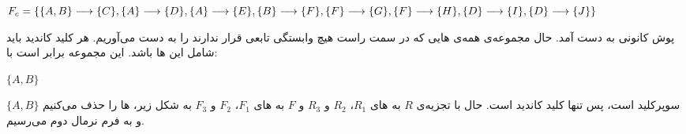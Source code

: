 \documentclass{article}
\begin{document}
\begin{itemize}
\begin{latin}
$
\\F_{c}=\\
\{\\
\{A, B\}\longrightarrow\{C\},\\
\{A\}\longrightarrow\{D\},\\
\{A\}\longrightarrow\{E\},\\
\{B\}\longrightarrow\{F\},\\
\{F\}\longrightarrow\{G\},\\
\{F\}\longrightarrow\{H\},\\
\{D\}\longrightarrow\{I\},\\
\{D\}\longrightarrow\{J\}\\
\}
$
\end{latin}
\end{itemize}
پوش کانونی به دست آمد. حال مجموعه‌ی همه‌ی هایی که در سمت راست هیچ وابستگی تابعی قرار ندارند را به دست می‌آوریم. هر کلید کاندید باید شامل این ها باشد. این مجموعه برابر است با:
\begin{latin}
$
\{A, B\}
$
\end{latin}
$
\{A, B\}
$
سوپرکلید است، پس تنها کلید کاندید است.
\newline
حال با تجزیه‌ی $R$ به های 
$R_{1}$، $R_{2}$ و $R_{3}$
و $F$ به
 های $F_{1}$، $F_{2}$ و $F_{3}$ 
به شکل زیر،
 ها را حذف می‌کنیم و به فرم نرمال دوم می‌رسیم.
\end{document}
